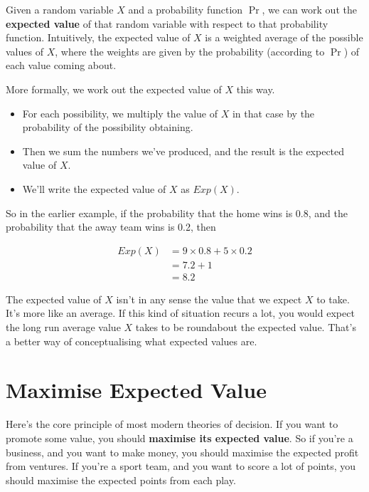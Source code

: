 Given a random variable $X$ and a probability function $\Pr$, we can work out the \textbf{expected value} of that random variable with respect to that probability function. Intuitively, the expected value of $X$ is a weighted average of the possible values of $X$, where the weights are given by the probability (according to $\Pr$) of each value coming about.

More formally, we work out the expected value of $X$ this way.

\begin{itemize}
\item{} For each possibility, we multiply the value of $X$ in that case by the probability of the possibility obtaining.

\item{} Then we sum the numbers we've produced, and the result is the expected value of $X$.

\item{} We'll write the expected value of $X$ as $Exp(X)$.

\end{itemize}

So in the earlier example, if the probability that the home wins is 0.8, and the probability that the away team wins is 0.2, then


\begin{align*}
Exp(X) &= 9 \times 0.8 + 5 \times 0.2 \\
 &= 7.2 + 1 \\
 &= 8.2
\end{align*} 


The expected value of $X$ isn't in any sense the value that we expect $X$ to take. It's more like an average. If this kind of situation recurs a lot, you would expect the long run average value $X$ takes to be roundabout the expected value. That's a better way of conceptualising what expected values are.

\section{Maximise Expected Value}
\label{maximiseexpectedvalue}

Here's the core principle of most modern theories of decision. If you want to promote some value, you should \textbf{maximise its expected value}. So if you're a business, and you want to make money, you should maximise the expected profit from ventures. If you're a sport team, and you want to score a lot of points, you should maximise the expected points from each play.

